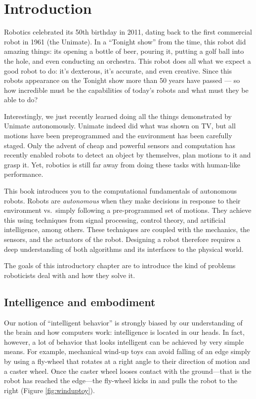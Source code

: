 \chapter{Introduction}\label{chap:introduction}
Robotics celebrated its 50th birthday in 2011, dating back to the first commercial robot in 1961 (the Unimate). In a ``Tonight show'' from the time, this robot did amazing things: its opening a bottle of beer, pouring it, putting a golf ball into the hole, and even conducting an orchestra. This robot does all what we expect a good robot to do: it's dexterous, it's accurate, and even creative. Since this robots appearance on the Tonight show more than 50 years have passed --- so how incredible must be the capabilities of today's robots and what must they be able to do?

Interestingly, we just recently learned doing all the things demonstrated by Unimate autonomously. Unimate indeed did what was shown on TV, but all motions have been preprogrammed and the environment has been carefully staged.  Only the advent of cheap and powerful sensors and computation has recently enabled robots to detect an object by themselves, plan motions to it and grasp it. Yet, robotics is still far away from doing these tasks with human-like performance.

This book introduces you to the computational fundamentals of autonomous robots. Robots are \emph{autonomous} when they make decisions in response to their environment vs.\ simply following a pre-programmed set of motions. They achieve this using techniques from signal processing, control theory, and artificial intelligence, among others. These techniques are coupled with the mechanics, the sensors, and the actuators of the robot. Designing a robot therefore requires a deep understanding of both algorithms and its interfaces to the physical world.

The goals of this introductory chapter are to introduce the kind of problems roboticists deal with and how they solve it.

\section{Intelligence and embodiment}
Our notion of ``intelligent behavior'' is strongly biased by our understanding of the brain and how computers work: intelligence is located in our heads. In fact, however, a lot of behavior that looks intelligent can be achieved by very simple means. For example, mechanical wind-up toys can avoid falling of an edge simply by using a fly-wheel that rotates at a right angle to their direction of motion and a caster wheel. Once the caster wheel looses contact with the ground---that is the robot has reached the edge---the fly-wheel kicks in and pulls the robot to the right (Figure \ref{fig:winduptoy}). 

